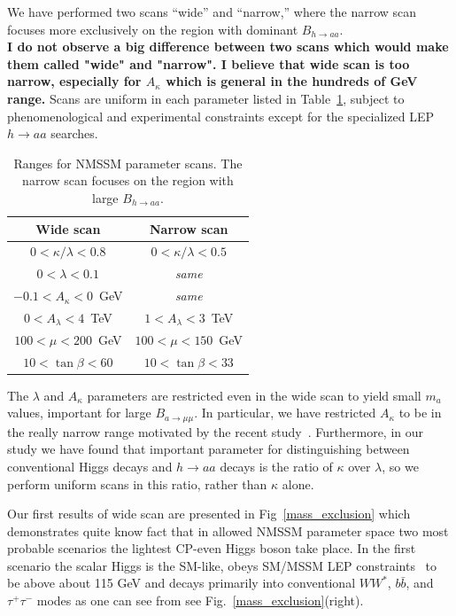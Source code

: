 \documentclass[aps,12pt,superscriptaddress,nofootinbib,floatfix,showpacs]{revtex4}
\begin{document}
We have  performed  two scans ``wide'' and ``narrow,'' 
where the narrow scan focuses more exclusively on the region
with dominant  $B_{h \to aa}$.\\
{\bf I do not observe a big difference between two scans
    which would make them called "wide" and "narrow".
    I believe that wide scan is too narrow, especially for $A_\kappa$
    which is  general in the hundreds of GeV range.}
Scans are uniform in each parameter listed in Table~\ref{brhaa_table},
subject to phenomenological and experimental constraints except for
the specialized LEP $h\to aa$ searches. 
\begin{table}[h]
\caption{Ranges for NMSSM parameter scans.  The narrow scan focuses on
the region with large $B_{h \to aa}$. \label{brhaa_table}}
\begin{center}
\renewcommand{\arraystretch}{1.2}
\begin{tabular}{| c c |}
\hline \mbox{\hspace{1.25 cm}}Wide scan\mbox{\hspace{1.25 cm}} & \mbox{\hspace{1.25 cm}}Narrow scan\mbox{\hspace{1.25 cm}} \\\hline
$0 < \kappa/\lambda < 0.8$ & $0 < \kappa/\lambda < 0.5$ \\
$0 < \lambda < 0.1$ & {\it same} \\
$-0.1 < A_\kappa < 0$~GeV & {\it same} \\
$0 < A_\lambda < 4$~TeV & $1 < A_\lambda < 3$~TeV \\
$100 < \mu < 200$~GeV & $100 < \mu < 150$~GeV \\
$10 < \tan\beta < 60$ & $10 < \tan\beta < 33$ \\\hline
\end{tabular}
\end{center}
\end{table}
 The $\lambda$ and $A_\kappa$
parameters are restricted even in the wide scan to yield small $m_a$
values, important for large $B_{a\to\mu\mu}$. 
In particular, we have restricted $A_\kappa$ to be in the really
narrow range motivated by the recent study~\cite{nmssm-ph7}.
Furthermore, in our study we have found that
important parameter for distinguishing between conventional Higgs
decays and  ${h \to aa}$ decays is the ratio of $\kappa$ over $\lambda$, so
we perform uniform scans in this ratio, rather than $\kappa$ alone.

Our first results of wide scan are presented in Fig~\ref{mass_exclusion}
which demonstrates quite know fact that in  allowed NMSSM parameter 
space two most probable scenarios the lightest CP-even Higgs boson 
take place.
In the first scenario the 
scalar Higgs is the SM-like,
obeys SM/MSSM LEP constraints~\cite{lep1exclusion,lep2exclusion}
to be above about 115 GeV
and  decays primarily into conventional $WW^*$, $b\bar{b}$,
and $\tau^+\tau^-$ modes 
as one can see from see Fig.~\ref{mass_exclusion}(right).
\end{document}

